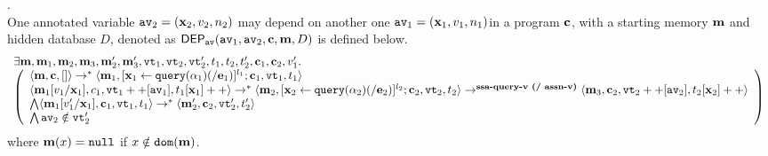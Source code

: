 {\begin{defn}
\label{def:avar_dep2}.
\\
{
One annotated variable $\mathtt{av}_2 = ({\boldsymbol{\mathbf{x}}}_2, v_2, n_2)$ may depend on another one  $\mathtt{av}_1 = ({\boldsymbol{\mathbf{x}}}_1, v_1, n_1)$in a program ${\boldsymbol{\mathbf{c}}}$,
with a starting memory ${\boldsymbol{\mathbf{m}}}$ and hidden database $D$, denoted as 
%
$\mathsf{DEP_{\mathtt{av}}}(\mathtt{av}_1, \mathtt{av}_2, {\boldsymbol{\mathbf{c}}}, {\boldsymbol{\mathbf{m}}}, D)$ is defined below. 
%
\[
\begin{array}{l}
\exists \ssa{m}, \ssa{m}_1, \ssa{m}_2, \ssa{m}_3, \ssa{m}_2', \ssa{m}_3', 
\vtrace_1, \vtrace_2, \vtrace_2', t_1, t_2, t_2', \ssa{c}_1, \ssa{c}_2, v_1'.\\
  \left (\begin{array}{l}   
\config{\ssa{m}, \ssa{c}, []} \rightarrow^{*} 
\config{\ssa{m}_1, [\assign{\ssa{x}_1}{\query({\qval}_1) (/ \sexpr_1)}]^{l_1} ; \ssa{c}_1, \vtrace_1, t_1} 
\\ 
\config{\ssa{m}_1[v_1/\ssa{x}_1], c_1, \vtrace_1 ++ [\av_1], t_1[\ssa{x}_1]++} 
\rightarrow^{*} 
\config{\ssa{m}_2, [\assign{\ssa{x}_2}{\query({\qval}_2) (/ \sexpr_2)}]^{l_2} ; \ssa{c}_2, \vtrace_2, t_2} 
\rightarrow^{\textbf{{ssa-query-v} (/ assn-v)}} 
\config{\ssa{m}_3, \ssa{c}_2,  \vtrace_2 ++ [\av_2], t_2[\ssa{x}_2]++} 
 \\ 
 \bigwedge
 \config{\ssa{m}_1[v_1'/\ssa{x}_1], \ssa{c}_1, \vtrace_1, t_1} 
\rightarrow^{*} 
\config{\ssa{m}_2', \ssa{c}_2,  \vtrace_2', t_2'}
\\
\bigwedge
\av_2 \notin \vtrace_2'
\end{array}
\right)
\end{array}
 \]
where ${\boldsymbol{\mathbf{m}}}(x) = \mathtt{null}$ if $x \notin \mathtt{dom}({\boldsymbol{\mathbf{m}}})$.
}
\end{defn}
%
}
